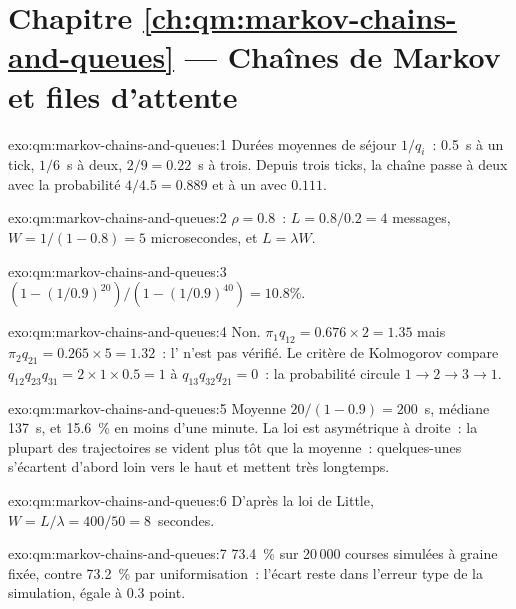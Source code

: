 \section*{Chapitre \ref{ch:qm:markov-chains-and-queues} --- Chaînes de Markov et files d'attente}

\begin{solution}{exo:qm:markov-chains-and-queues:1}
Durées moyennes de séjour $1/q_i$~: 0.5~s à un tick, $1/6$~s à deux, $2/9 = 0.22$~s à trois. Depuis trois ticks, la chaîne passe à
deux avec la probabilité $4/4.5 = 0.889$ et à un avec $0.111$.
\end{solution}

\begin{solution}{exo:qm:markov-chains-and-queues:2}
$\rho = 0.8$~: $L = 0.8/0.2 = 4$ messages, $W = 1/(1 - 0.8) = 5$ microsecondes, et $L = \lambda W$.
\end{solution}

\begin{solution}{exo:qm:markov-chains-and-queues:3}
$(1 - (1/0.9)^{20})/(1 - (1/0.9)^{40}) = 10.8\%$.
\end{solution}

\begin{solution}{exo:qm:markov-chains-and-queues:4}
Non. $\pi_1q_{12} = 0.676 \times 2 = 1.35$ mais $\pi_2q_{21} = 0.265 \times 5 = 1.32$~: l' n'est pas vérifié. Le critère de Kolmogorov
compare $q_{12}q_{23}q_{31} = 2 \times 1 \times 0.5 = 1$ à $q_{13}q_{32}q_{21} = 0$~: la probabilité circule $1 \to 2 \to 3 \to 1$.
\end{solution}

\begin{solution}{exo:qm:markov-chains-and-queues:5}
Moyenne $20/(1 - 0.9) = 200$~s, médiane 137~s, et 15.6~\% en moins d'une minute. La loi est asymétrique à droite~: la plupart des trajectoires
se vident plus tôt que la moyenne~: quelques-unes s'écartent d'abord loin vers le haut et mettent très longtemps.
\end{solution}

\begin{solution}{exo:qm:markov-chains-and-queues:6}
D'après la loi de Little, $W = L/\lambda = 400/50 = 8$~secondes.
\end{solution}

\begin{solution}{exo:qm:markov-chains-and-queues:7}
73.4~\% sur 20\,000 courses simulées à graine fixée, contre 73.2~\% par uniformisation~: l'écart reste dans l'erreur type
de la simulation, égale à 0.3 point.
\end{solution}

